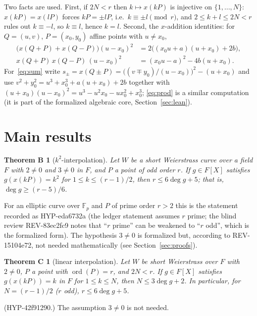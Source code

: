 \documentclass[11pt,a4paper]{article}
\newtheorem*{thmB}{Theorem B}
\newtheorem*{thmC}{Theorem C}
\theoremstyle{remark}
\newcommand{\F}{\mathbb{F}}
\begin{document}
Two facts are used. First, if $2N<r$ then $k\mapsto x(kP)$ is injective on $\{1,\dots,N\}$: $x(kP)=x(lP)$ forces
$kP=\pm lP$, i.e.\ $k\equiv\pm l \pmod r$, and $2\le k+l\le 2N<r$ rules out $k\equiv -l$, so $k\equiv l$, hence $k=l$. Second, the $x$-addition identities: for $Q=(u,v)$, $P=(x_0,y_0)$ affine points with
$u\ne x_0$,
\begin{align}
\bigl(x(Q+P)+x(Q-P)\bigr)(u-x_0)^2 &= 2\bigl((x_0u+a)(u+x_0)+2b\bigr),\label{eq:sum}\\
x(Q+P)\,x(Q-P)\,(u-x_0)^2 &= (x_0u-a)^2-4b(u+x_0).\label{eq:prod}
\end{align}
For~\eqref{eq:sum} write $s_\pm=x(Q\pm P)=\bigl((v\mp y_0)/(u-x_0)\bigr)^2-(u+x_0)$ and use
$v^2+y_0^2=u^3+x_0^3+a(u+x_0)+2b$ together with
$(u+x_0)(u-x_0)^2=u^3-u^2x_0-ux_0^2+x_0^3$; \eqref{eq:prod} is a similar computation (it is part of the
formalized algebraic core, Section~\ref{sec:lean}).

\section{Main results}\label{sec:main}
\begin{thmB}[$k^2$-interpolation]\label{thm:B}
Let $W$ be a short Weierstrass curve over a field $F$ with $2\ne0$ and $3\ne0$ in $F$, and $P$ a point of odd order $r$.
If $g\in F[X]$ satisfies $g(x(kP))=k^2$ for $1\le k\le (r-1)/2$, then $r\le 6\deg g+5$; that is, $\deg g\ge (r-5)/6$.
\end{thmB}
For an elliptic curve over $\F_p$ and $P$ of prime order $r>2$ this is the statement recorded as
\mbox{HYP-eda6732a} (the ledger statement assumes $r$ prime; the blind review \mbox{REV-83ec2fc9} notes that ``$r$ prime'' can
be weakened to ``$r$ odd'', which is the formalized form). The hypothesis $3\ne0$ is formalized but, according to \mbox{REV-15104e72}, not needed mathematically (see Section~\ref{sec:proofs}).

\begin{thmC}[linear interpolation]\label{thm:C}
Let $W$ be short Weierstrass over $F$ with $2\ne0$, $P$ a point with $\operatorname{ord}(P)=r$, and $2N<r$.
If $g\in F[X]$ satisfies $g(x(kP))=k$ in $F$ for $1\le k\le N$, then $N\le 3\deg g+2$. In particular, for $N=(r-1)/2$ ($r$ odd), $r\le 6\deg g+5$.
\end{thmC}
(\mbox{HYP-42f91290}.) The assumption $3\neq 0$ is not needed.
\end{document}
